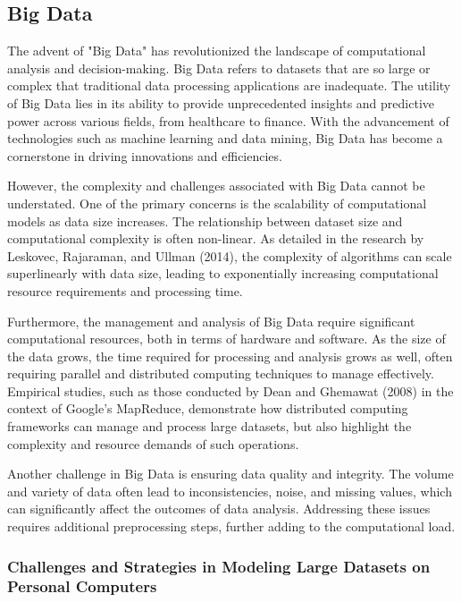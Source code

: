 \documentclass[12pt, twoside,hidelinks]{article}
\theoremstyle{definition}
\numberwithin{equation}{section}
\begin{document}
\subsection{Big Data}

The advent of "Big Data" has revolutionized the landscape of computational analysis and decision-making. Big Data refers to datasets that are so large or complex that traditional data processing applications are inadequate. The utility of Big Data lies in its ability to provide unprecedented insights and predictive power across various fields, from healthcare to finance. With the advancement of technologies such as machine learning and data mining, Big Data has become a cornerstone in driving innovations and efficiencies.
\newline

However, the complexity and challenges associated with Big Data cannot be understated. One of the primary concerns is the scalability of computational models as data size increases. The relationship between dataset size and computational complexity is often non-linear. As detailed in the research by Leskovec, Rajaraman, and Ullman (2014), the complexity of algorithms can scale superlinearly with data size, leading to exponentially increasing computational resource requirements and processing time.
\newline

Furthermore, the management and analysis of Big Data require significant computational resources, both in terms of hardware and software. As the size of the data grows, the time required for processing and analysis grows as well, often requiring parallel and distributed computing techniques to manage effectively. Empirical studies, such as those conducted by Dean and Ghemawat (2008) in the context of Google's MapReduce, demonstrate how distributed computing frameworks can manage and process large datasets, but also highlight the complexity and resource demands of such operations.
\newline

Another challenge in Big Data is ensuring data quality and integrity. The volume and variety of data often lead to inconsistencies, noise, and missing values, which can significantly affect the outcomes of data analysis. Addressing these issues requires additional preprocessing steps, further adding to the computational load.
\newline


\subsubsection{Challenges and Strategies in Modeling Large Datasets on Personal Computers}
\end{document}
